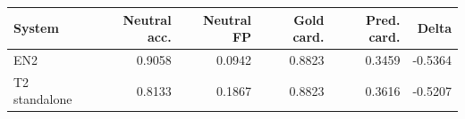 \begin{tabular}{lrrrrr}
\toprule
System & Neutral acc. & Neutral FP & Gold card. & Pred. card. & Delta \\
\midrule
EN2 & 0.9058 & 0.0942 & 0.8823 & 0.3459 & -0.5364 \\
T2 standalone & 0.8133 & 0.1867 & 0.8823 & 0.3616 & -0.5207 \\
\bottomrule
\end{tabular}
